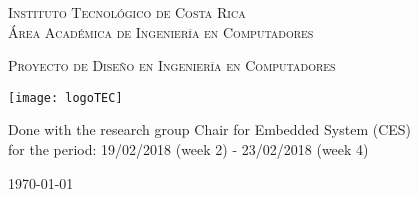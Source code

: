 
\thispagestyle{empty} 

\begin{center}

\textsc{\LARGE Instituto Tecnol\'ogico de Costa Rica} \\
\textsc{\Large \'Area Acad\'emica de Ingenier\'ia en Computadores}

\textsc{\Large Proyecto de Dise\~no en Ingenier\'ia en Computadores}


\par\vspace{20mm}

\texttt{[image: logoTEC]}

\par\vspace*{\fill}

{\LARGE\bf{\textsf{ \Huge \scriptTitle}}}

\par\vspace*{\fill}

Done with the research group Chair for Embedded System (CES) \\
for the period: 19/02/2018 (week 2) - 23/02/2018 (week 4) 

\par\vspace{20mm}

\textsc{\Large \scriptAuthor}

\vspace*{\fill}

{\today}

\end{center}
\newpage 
\cleardoublepage  
